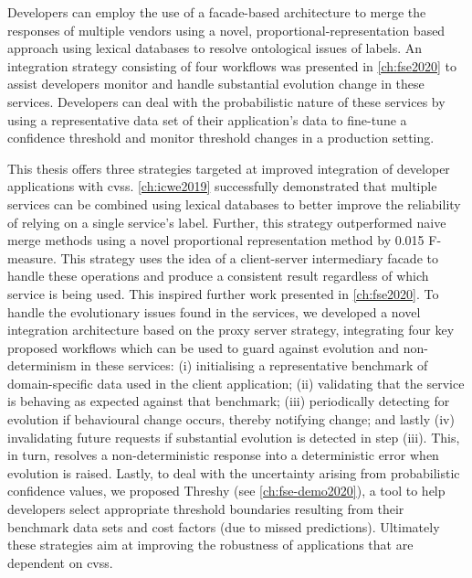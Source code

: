 
\begin{callout}
Developers can employ the use of a facade-based architecture to merge the responses of \textup{multiple} vendors using a novel, proportional-representation based approach using lexical databases to resolve ontological issues of labels. An integration strategy consisting of four workflows was presented in \cref{ch:fse2020} to assist developers monitor and handle substantial evolution change in these services. Developers can deal with the probabilistic nature of these services by using a representative data set of their application's data to fine-tune a confidence threshold and monitor threshold changes in a production setting.
\end{callout}

This thesis offers three strategies targeted at improved integration of developer applications with \glspl{cvs}. \cref{ch:icwe2019} successfully demonstrated that multiple services can be combined using lexical databases to better improve the reliability of relying on a single service's label. Further, this strategy outperformed naive merge methods using a novel proportional representation method by 0.015 F-measure. This strategy uses the idea of a client-server intermediary facade to handle these operations and produce a consistent result regardless of which service is being used. This inspired further work presented in \cref{ch:fse2020}. To handle the evolutionary issues found in the services, we developed a novel integration architecture based on the proxy server strategy, integrating four key proposed workflows which can be used to guard against evolution and non-determinism in these services: (i) initialising a representative benchmark of domain-specific data used in the client application; (ii) validating that the service is behaving as expected against that benchmark; (iii) periodically detecting for evolution if behavioural change occurs, thereby notifying change; and lastly (iv) invalidating future requests if substantial evolution is detected in step (iii). This, in turn, resolves a non-deterministic response into a deterministic error when evolution is raised. Lastly, to deal with the uncertainty arising from probabilistic confidence values, we proposed Threshy (see \cref{ch:fse-demo2020}), a tool to help developers select appropriate threshold boundaries resulting from their benchmark data sets and cost factors (due to missed predictions). Ultimately these strategies aim at improving the robustness of applications that are dependent on \glspl{cvs}.


